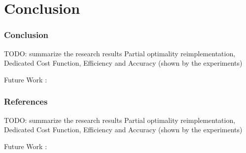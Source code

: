 \section{Conclusion}
\frame{\tableofcontents[currentsection]}


\begin{frame}
    \frametitle{Conclusion}
    TODO: summarize the research results
    Partial optimality reimplementation, 
    Dedicated Cost Function,
    Efficiency and Accuracy (shown by the experiments) 
    
    Future Work :
\end{frame}


\begin{frame}
    \frametitle{References}
    TODO: summarize the research results
    Partial optimality reimplementation, 
    Dedicated Cost Function,
    Efficiency and Accuracy (shown by the experiments) 
    
    Future Work :
\end{frame}

